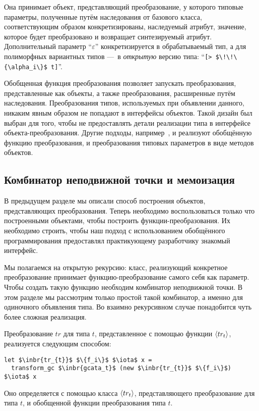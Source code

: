 Она принимает объект, представляющий преобразование, у которого типовые параметры, полученные путём наследования от базового класса, соответствующим образом конкретизированы, наследуемый атрибут, значение, которое будет преобразовано и возвращает синтезируемый атрибут.
Дополнительный параметр ``$\varepsilon$'' конкретизируется в обрабатываемый тип, а 
для полиморфных вариантных типов ---~в \emph{открытую}
версию типа:  ``\lstinline|[> $\!\!\{\alpha_i\}$ t]|''. 

Обобщенная функция преобразования позволяет запускать   преобразования, представленные как объекты, а также преобразования, расширенные путём наследования. Преобразования типов, используемых при объявлении данного, никаким явным образом не попадают в интерфейсы объектов. Такой дизайн был выбран для того, чтобы не предоставлять детали реализации типа в интерфейсе объекта-преобразования. Другие подходы, например~\cite{Visitors}, и реализуют обобщённую функцию преобразования, и преобразования типовых параметров в виде методов объектов.


\subsection{Комбинатор неподвижной точки и мемоизация}
\label{memofix}

В предыдущем разделе мы описали способ построения объектов, представляющих преобразования. Теперь необходимо воспользоваться только что построенными объектами, чтобы построить функции-преобразования. Их необходимо строить, чтобы наш подход с использованием обобщённого программирования предоставлял практикующему разработчику знакомый интерфейс.

Мы полагаемся  на открытую рекурсию: класс, реализующий конкретное преобразование принимает функцию-преобразование самого себя как параметр.
Чтобы создать такую функцию необходим комбинатор неподвижной точки. В  этом разделе
мы рассмотрим только простой такой комбинатор, а именно для одиночного объявления типа.
Во взаимно рекурсивном случае понадобится чуть более сложная реализация. %


Преобразование $tr$ для типа $t$, представленное с помощью функции $\left<tr_{t}\right>$, реализуется следующим способом:

\begin{lstlisting}
let $\inbr{tr_{t}}$ $\{f_i\}$ $\iota$ x =
  transform_gc $\inbr{gcata_t}$ (new $\inbr{tr_{t}}$ $\{f_i\}$) $\iota$ x
\end{lstlisting}
\noindent Оно определяется с помощью класса  $\left<tr_{t}\right>$, представляющего преобразование для типа $t$, и обобщенной функции преобразования типа $t$. 

